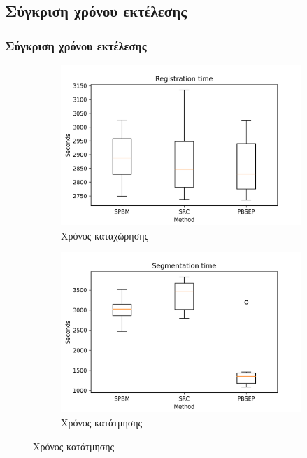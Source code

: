 \documentclass{beamer}
\begin{document}
\subsection{Σύγκριση χρόνου εκτέλεσης}


\begin{frame}
\frametitle{Σύγκριση χρόνου εκτέλεσης}

\begin{figure}[H]
    \centering

    \begin{subfigure}[b]{0.38\linewidth}
    \includegraphics[width=\linewidth]{Registration_time_plot.png}
    \caption{Χρόνος καταχώρησης}
    \end{subfigure}
    \begin{subfigure}[b]{0.38\linewidth}
    \includegraphics[width=\linewidth]{Segmentation_time_plot.png}
    \caption{Χρόνος κατάτμησης}
    \end{subfigure}


\end{figure}
\end{frame}
\end{document}
